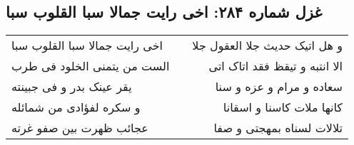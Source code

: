 \begin{center}
\section*{غزل شماره ۲۸۴: اخی رایت جمالا سبا القلوب سبا}
\label{sec:0284}
\begin{longtable}{l p{0.5cm} r}
اخی رایت جمالا سبا القلوب سبا
&&
و هل اتیک حدیث جلا العقول جلا
\\
الست من یتمنی الخلود فی طرب
&&
الا انتبه و تیقظ فقد اتاک اتی
\\
یقر عینک بدر و فی جبینته
&&
سعاده و مرام و عزه و سنا
\\
و سکره لفؤادی من شمائله
&&
کانها ملات کاسنا و اسقانا
\\
عجائب ظهرت بین صفو غرته
&&
تلالات لسناه بمهجتی و صفا
\\
\end{longtable}
\end{center}
